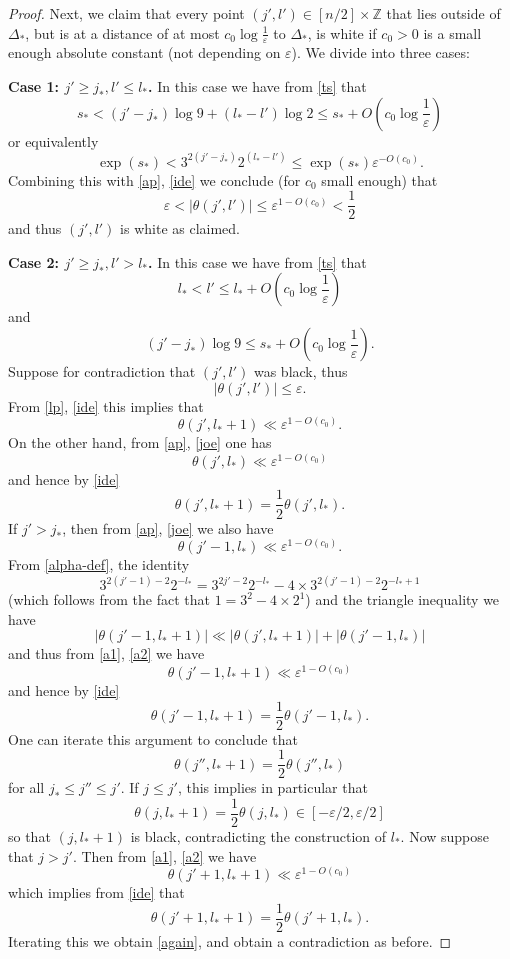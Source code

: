 \documentclass[12pt,a4paper,reqno]{amsart}
\numberwithin{equation}{section}
\theoremstyle{plain}
\theoremstyle{definition}
\newcommand\Z{\mathbb{Z}}
\newcommand\eps{\varepsilon}
\begin{document}
\begin{proof}
Next, we claim that every point $(j',l') \in [n/2] \times \Z$ that lies outside of $\Delta_*$, but is at a distance of at most $c_0 \log \frac{1}{\eps}$ to $\Delta_*$, is white if $c_0>0$ is a small enough absolute constant (not depending on $\eps$).  We divide into three cases:

\textbf{Case 1: $j' \geq j_*, l' \leq l_*$.}  In this case we have from \eqref{ts} that
$$ s_* < (j'-j_*) \log 9 + (l_*-l') \log 2 \leq s_* + O\left(c_0 \log \frac{1}{\eps}\right)$$
or equivalently
$$ \exp(s_*) < 3^{2(j'-j_*)} 2^{(l_*-l')} \leq \exp(s_*) \eps^{-O(c_0)}.$$
Combining this with \eqref{ap}, \eqref{ide} we conclude (for $c_0$ small enough) that
$$ \eps < |\theta(j',l')| \leq \eps^{1-O(c_0)} < \frac{1}{2}$$
and thus $(j',l')$ is white as claimed.

\textbf{Case 2: $j' \geq j_*, l' > l_*$.}  In this case we have from \eqref{ts} that
\begin{equation}\label{lp}
 l_* < l' \leq l_* + O\left( c_0 \log \frac{1}{\eps} \right)
\end{equation}
and
\begin{equation}\label{joe}
 (j'-j_*) \log 9 \leq s_* + O\left(c_0 \log \frac{1}{\eps}\right).
\end{equation}
Suppose for contradiction that $(j',l')$ was black, thus
$$ |\theta(j',l')| \leq \eps.$$
From \eqref{lp}, \eqref{ide} this implies that
$$ \theta(j',l_*+1) \ll \eps^{1-O(c_0)}.$$
On the other hand, from \eqref{ap}, \eqref{joe} one has
\begin{equation}\label{a1}
 \theta(j',l_*) \ll \eps^{1-O(c_0)}
\end{equation}
and hence by \eqref{ide}
\begin{equation}\label{a2}
 \theta(j',l_*+1) = \frac{1}{2} \theta(j',l_*).
\end{equation}
If $j' > j_*$, then from \eqref{ap}, \eqref{joe} we also have
$$ \theta(j'-1,l_*) \ll \eps^{1-O(c_0)}.$$
From \eqref{alpha-def}, the identity
$$ 3^{2(j'-1)-2} 2^{-l_*} = 3^{2j'-2} 2^{-l_*} - 4 \times 3^{2(j'-1)-2} 2^{-l_*+1}$$
(which follows from the fact that $1 = 3^2 - 4 \times 2^1$) and the triangle inequality we have
\begin{equation}\label{div}
 |\theta(j'-1,l_*+1)| \ll |\theta(j',l_*+1)| + |\theta(j'-1,l_*)|
\end{equation}
and thus from \eqref{a1}, \eqref{a2} we have
$$ \theta(j'-1,l_*+1) \ll \eps^{1-O(c_0)}$$
and hence by \eqref{ide}
$$  \theta(j'-1,l_*+1) = \frac{1}{2} \theta(j'-1,l_*).$$
One can iterate this argument to conclude that
$$ \theta(j'',l_*+1) = \frac{1}{2} \theta(j'',l_*)$$
for all $j_* \leq j'' \leq j'$.  If $j \leq j'$, this implies in particular that
\begin{equation}\label{again}
 \theta(j, l_*+1) = \frac{1}{2} \theta(j,l_*) \in [-\eps/2,\eps/2]
\end{equation}
so that $(j,l_*+1)$ is black, contradicting the construction of $l_*$.  Now suppose that $j > j'$.  Then from \eqref{a1}, \eqref{a2} we have
$$ \theta(j'+1, l_*+1) \ll \eps^{1-O(c_0)}$$
which implies from \eqref{ide} that
$$ \theta(j'+1, l_*+1) = \frac{1}{2} \theta(j'+1, l_*).$$
Iterating this we obtain \eqref{again}, and obtain a contradiction as before.


\end{proof}
\end{document}
